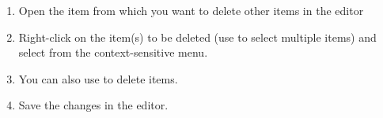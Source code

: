 
\begin{enumerate}
\item Open the item from which you want to delete other items in the editor
\item Right-click on the item(s) to be deleted (use   to select multiple items) and select 
 from the context-sensitive menu.  
\item You can also use  to delete items.  
\item Save the changes in the editor.
\end{enumerate}

